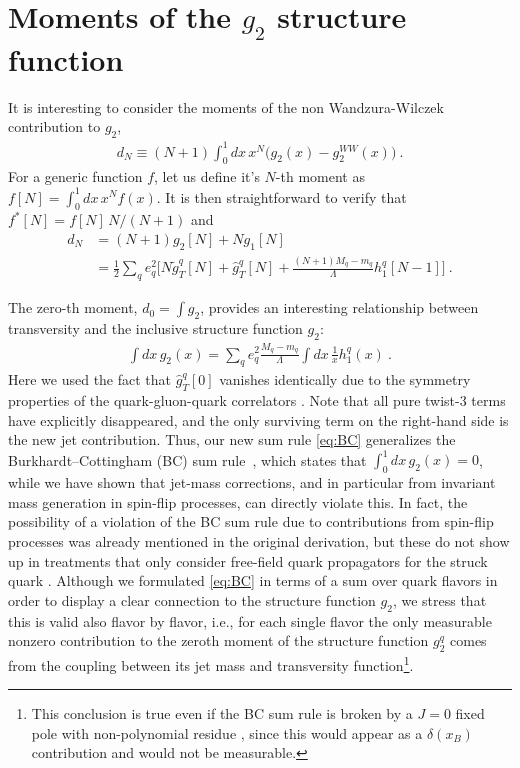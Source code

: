 \documentclass[preprintnumbers,floatfix,nofootinbib]{revtex4}
\newcommand{\xbj}{{x_B}}                   %
\newcommand{\mj}{M_q}
\newcommand{\mq}{m_q}
\begin{document}
\section{Moments of the $g_2$ structure function}
\label{sec:moments}

It is interesting to consider the moments of the non Wandzura-Wilczek contribution to $g_2$,
\begin{align}
  d_N \equiv (N+1) \int_0^1 dx\,x^N \bigg( g_2(x) - g_2^{WW}(x) \bigg) \ .
\end{align}
For a generic function $f$, let us define it's $N$-th moment as $f[N]=\int_0^1 dx\, x^{N} f(x)$. It is then straightforward to verify that $f^*[N] = f[N]\,N/(N+1)$ and  
\begin{align}
  d_N & = (N+1) g_2[N] + N g_1[N] \\
  & = \frac12 \sum_q e_q^2 \bigg[ N \tilde g_T^q[N] + \hat g_T^q[N]  
    + \frac{(N+1) \mj- \mq}{\Lambda} h_1^q[N-1] \bigg] \ .
\end{align}

The zero-th moment, $d_0=\int g_2$, provides an interesting relationship between transversity and the inclusive structure function $g_2$:
\begin{align}
  \label{eq:BC}
  \int dx\, g_2(x) = \sum_q e_q^2 \frac{\mj-\mq}{\Lambda} \int dx\, \frac{1}{x} h_1^q(x) \ .
\end{align}
Here we used the fact that $\widehat g_T^q[0]$ vanishes identically due to the symmetry properties of the quark-gluon-quark correlators \cite{Accardi:2009au}.
%
Note that all pure twist-3 terms have explicitly disappeared, and the only surviving term on the right-hand side is the new jet contribution. Thus, our new sum rule \eqref{eq:BC}
generalizes the Burkhardt--Cottingham (BC) sum rule~\cite{Burkhardt:1970ti},
which states that  $\int_0^1 dx\, g_2(x) =0$, while we have shown that jet-mass corrections, and in particular from invariant mass generation in spin-flip processes, can directly violate this.
In fact, the possibility of a violation of the BC sum rule due to 
contributions from spin-flip processes was already mentioned in the original
derivation, but these do not show up in treatments that only
consider free-field quark propagators for the struck quark
\cite{Jaffe:1996zw}.  Although we formulated \eqref{eq:BC} in terms of a sum over quark flavors in order to display a clear
connection to the structure function $g_2$, we stress that this is valid also
flavor by flavor, i.e., for each single flavor the only measurable nonzero contribution to the zeroth moment of the
structure function $g_2^q$ comes from the coupling between its jet mass and transversity function\footnote{This conclusion is true even if the BC sum rule is broken by a $J = 0$ fixed pole with
non-polynomial residue \cite{Jaffe:1996zw}, since this would appear as a
$\delta(\xbj)$ contribution and would not be measurable.}.
\end{document}
